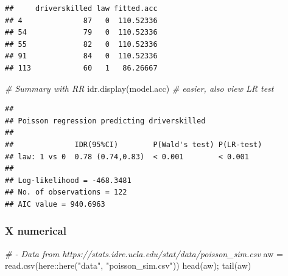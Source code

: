 \documentclass[
]{book}
\makeatletter
\newenvironment{Shaded}{\begin{snugshade}}{\end{snugshade}}
\newcommand{\CommentTok}[1]{\textcolor[rgb]{0.37,0.37,0.37}{\textit{#1}}}
\newcommand{\FloatTok}[1]{\textcolor[rgb]{0.06,0.06,0.06}{#1}}
\newcommand{\FunctionTok}[1]{\textcolor[rgb]{0,0,0}{#1}}
\newcommand{\NormalTok}[1]{#1}
\newcommand{\OtherTok}[1]{\textcolor[rgb]{0.37,0.37,0.37}{#1}}
\newcommand{\SpecialCharTok}[1]{\textcolor[rgb]{0,0,0}{#1}}
\newcommand{\StringTok}[1]{\textcolor[rgb]{0.5,0.5,0.5}{#1}}
\newenvironment{kframe}{%
\medskip{}
\setlength{\fboxsep}{.8em}
 \def\at@end@of@kframe{}%
 \ifinner\ifhmode%
  \def\at@end@of@kframe{\end{minipage}}%
  \begin{minipage}{\columnwidth}%
 \fi\fi%
 \def\FrameCommand##1{\hskip\@totalleftmargin \hskip-\fboxsep
 \colorbox{shadecolor}{##1}\hskip-\fboxsep
     \hskip-\linewidth \hskip-\@totalleftmargin \hskip\columnwidth}%
 \MakeFramed {\advance\hsize-\width
   \@totalleftmargin\z@ \linewidth\hsize
   \@setminipage}}%
 {\par\unskip\endMakeFramed%
 \at@end@of@kframe}
\renewenvironment{Shaded}{\begin{kframe}}{\end{kframe}}
\makeatother
\begin{document}
\begin{Shaded}
\end{Shaded}

\begin{verbatim}
##     driverskilled law fitted.acc
## 4              87   0  110.52336
## 54             79   0  110.52336
## 55             82   0  110.52336
## 91             84   0  110.52336
## 113            60   1   86.26667
\end{verbatim}

\begin{Shaded}
\begin{Highlighting}[]
\CommentTok{\# Summary with RR}
\FunctionTok{idr.display}\NormalTok{(model.acc)  }\CommentTok{\# easier, also view LR test}
\end{Highlighting}
\end{Shaded}

\begin{verbatim}
## 
## Poisson regression predicting driverskilled 
##  
##              IDR(95%CI)        P(Wald's test) P(LR-test)
## law: 1 vs 0  0.78 (0.74,0.83)  < 0.001        < 0.001   
##                                                         
## Log-likelihood = -468.3481
## No. of observations = 122
## AIC value = 940.6963
\end{verbatim}

\hypertarget{x-numerical}{%
\subsubsection{X numerical}\label{x-numerical}}

\begin{Shaded}
\begin{Highlighting}[]
\CommentTok{\# {-} Data from https://stats.idre.ucla.edu/stat/data/poisson\_sim.csv}
\NormalTok{aw }\OtherTok{=} \FunctionTok{read.csv}\NormalTok{(here}\SpecialCharTok{::}\FunctionTok{here}\NormalTok{(}\StringTok{"data"}\NormalTok{, }\StringTok{"poisson\_sim.csv"}\NormalTok{))}
\FunctionTok{head}\NormalTok{(aw); }\FunctionTok{tail}\NormalTok{(aw)}
\end{Highlighting}
\end{Shaded}
\end{document}
